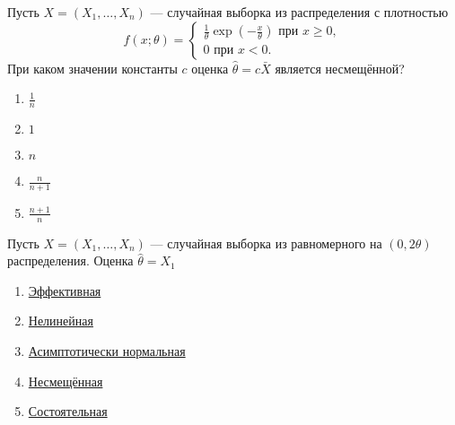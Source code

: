 \documentclass[t]{beamer}
\begin{document}
 \begin{frame} \label{45} 
\begin{block}{45} 

Пусть $X = (X_1, \ldots , X_n)$ — случайная выборка из распределения с плотностью
\[
f(x; \theta) =
\begin{cases}
\frac{1}{\theta}\exp(-\frac{x}{\theta}) \text{ при } x \geq 0,  \\
0 \text{ при } x < 0.
\end{cases}
\]
При каком значении константы $c$ оценка  $\hat{\theta} = c \bar{X}$ является несмещённой?

 \end{block} 
\begin{enumerate} 
\item[] \hyperlink{45-No}{\beamergotobutton{} $\frac{1}{n}$}
\item[] \hyperlink{45-Yes}{\beamergotobutton{} $1$}
\item[] \hyperlink{45-No}{\beamergotobutton{} $n$}
\item[] \hyperlink{45-No}{\beamergotobutton{} $\frac{n}{n + 1}$}
\item[] \hyperlink{45-No}{\beamergotobutton{} $\frac{n + 1}{n}$}
\end{enumerate}
\end{frame} 


 \begin{frame} \label{46} 
\begin{block}{46} 

Пусть $X = (X_1, \ldots , X_n)$ — случайная выборка из равномерного на $(0, 2\theta)$ распределения. Оценка $\hat{\theta} = X_1$
  


 \end{block} 
\begin{enumerate} 
\item[] \hyperlink{46-No}{\beamergotobutton{} Эффективная}
\item[] \hyperlink{46-No}{\beamergotobutton{} Нелинейная}
\item[] \hyperlink{46-No}{\beamergotobutton{} Асимптотически нормальная}
\item[] \hyperlink{46-Yes}{\beamergotobutton{} Несмещённая}
\item[] \hyperlink{46-No}{\beamergotobutton{} Состоятельная}
\end{enumerate} 
\end{frame} 
\end{document}

